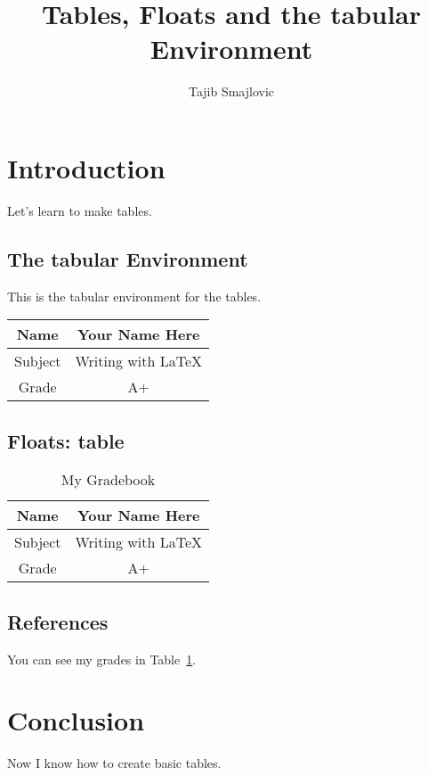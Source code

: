 \documentclass{article}
\title{Tables, Floats and the tabular Environment}
\author{Tajib Smajlovic}
\date{}
\begin{document}
	
	\maketitle
	
	
	\section{Introduction}
	Let's learn to make tables.
	
	\subsection{The tabular Environment}
	This is the tabular environment for the tables.
	\vspace{.3cm}
	
	\begin{tabular}{|c||c|}
		\hline 
		Name & Your Name Here \\
		\hline
		Subject & Writing with \LaTeX \\
		\hline
		Grade & A+ \\
		\hline
	\end{tabular}

	\subsection{Floats: table}
	\begin{table}[htbp]
		\caption{My Gradebook}
		\begin{center}
			\begin{tabular}{|c||c|}
				\hline 
				Name & Your Name Here \\
				\hline
				Subject & Writing with \LaTeX \\
				\hline
				Grade & A+ \\
				\hline
			\end{tabular}
		\end{center}
		\label{tab:grades}
	\end{table}
	
	\subsection{References}
	You can see my grades in Table~\ref{tab:grades}.
	
	
	\section{Conclusion}
	Now I know how to create basic tables.
	
\end{document}
